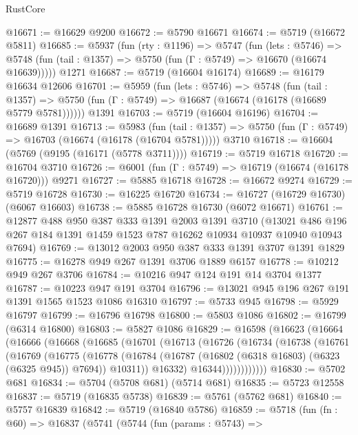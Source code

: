 \begin{lexlean}{RustCore}
\begin{coremodule}
@16671 := @16629 @9200
@16672 := @5790 @16671
@16674 := @5719 (@16672 @5811)
@16685 := @5937
    (fun (rty : @1196) =>
    @5747
      (fun (lets : @5746) =>
      @5748 (fun (tail : @1357) => @5750 (fun (Γ : @5749) => @16670 (@16674 @16639)))))
    @1271
@16687 := @5719 (@16604 @16174)
@16689 := @16179 @16634 @12606
@16701 := @5959
    (fun (lets : @5746) =>
    @5748
      (fun (tail : @1357) =>
      @5750 (fun (Γ : @5749) => @16687 (@16674 (@16178 (@16689 @5779 @5781))))))
    @1391
@16703 := @5719 (@16604 @16196)
@16704 := @16689 @1391
@16713 := @5983
    (fun (tail : @1357) => @5750 (fun (Γ : @5749) => @16703 (@16674 (@16178 (@16704 @5781)))))
    @3710
@16718 := @16604 (@5769 (@9195 (@16171 (@5778 @3711))))
@16719 := @5719 @16718
@16720 := @16704 @3710
@16726 := @6001 (fun (Γ : @5749) => @16719 (@16674 (@16178 @16720))) @9271
@16727 := @5885 @16718
@16728 := @16672 @9274
@16729 := @5719 @16728
@16730 := @16225 @16720
@16734 := @16727 (@16729 @16730) (@6067 @16603)
@16738 := @5885 @16728 @16730 (@6072 @16671)
@16761 := @12877
    @488
    @950
    @387
    @333
    @1391
    @2003
    @1391
    @3710
    (@13021 @486 @196 @267 @184 @1391 @1459 @1523 @787 @16262 @10934 @10937 @10940 @10943 @7694)
@16769 := @13012 @2003 @950 @387 @333 @1391 @3707 @1391 @1829
@16775 := @16278 @949 @267 @1391 @3706 @1889 @6157
@16778 := @10212 @949 @267 @3706
@16784 := @10216 @947 @124 @191 @14 @3704 @1377
@16787 := @10223 @947 @191 @3704
@16796 := @13021 @945 @196 @267 @191 @1391 @1565 @1523 @1086 @16310
@16797 := @5733 @945
@16798 := @5929 @16797
@16799 := @16796 @16798
@16800 := @5803 @1086
@16802 := @16799 (@6314 @16800)
@16803 := @5827 @1086
@16829 := @16598
    (@16623
      (@16664
        (@16666
          (@16668
            (@16685
              (@16701
                (@16713
                  (@16726
                    (@16734
                      (@16738
                        (@16761
                          (@16769
                            (@16775
                              (@16778
                                (@16784
                                  (@16787 (@16802 (@6318 @16803) (@6323 (@6325 @945)) @7694))
                                  @10311))
                              @16332)
                            @16344))))))))))))
@16830 := @5702 @681
@16834 := @5704 (@5708 @681) (@5714 @681)
@16835 := @5723 @12558
@16837 := @5719 (@16835 @5738)
@16839 := @5761 (@5762 @681)
@16840 := @5757 @16839
@16842 := @5719 (@16840 @5786)
@16859 := @5718
    (fun (fn : @60) =>
    @16837
      (@5741
        (@5744
          (fun (params : @5743) =>

\end{coremodule}
\end{lexlean}
